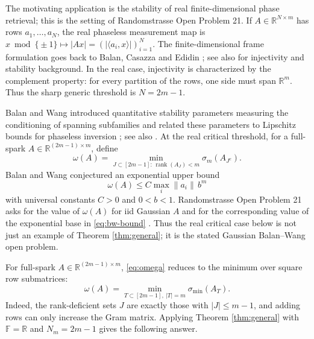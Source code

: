 \documentclass[10pt,a4paper]{amsart}
\DeclareMathOperator{\rank}{rank}
\newcommand{\R}{\mathbb{R}}
\newcommand{\F}{\mathbb{F}}
\begin{document}
The motivating application is the stability of real finite-dimensional phase retrieval; this is the
setting of Randomstrasse Open Problem 21. If $A\in\R^{N\times m}$ has rows $a_1,\ldots,a_N$, the real
phaseless measurement map is $x\bmod\{\pm1\}\mapsto |Ax|=(|\langle a_i,x\rangle|)_{i=1}^N$. The
finite-dimensional frame formulation goes back to Balan, Casazza and Edidin
\cite{BalanCasazzaEdidin2006}; see also \cite{BandeiraCahillMixonNelson2014,
ConcaEdidinHeringVinzant2015,GrohsKoppensteinerRathmair2020} for injectivity and stability background.
In the real case, injectivity is characterized by the complement property: for every partition of the
rows, one side must span $\R^m$. Thus the sharp generic threshold is $N=2m-1$.

Balan and Wang introduced quantitative stability parameters measuring the conditioning of spanning
subfamilies and related these parameters to Lipschitz bounds for phaseless inversion
\cite{BalanWang2015}; see also \cite{Balan2017,BalanZou2016,EldarMendelson2014}. At the real critical
threshold, for a full-spark $A\in\R^{(2m-1)\times m}$, define
\begin{equation}\label{eq:omega}
  \omega(A)=\min_{J\subset[2m-1]:\,\rank(A_J)<m}\sigma_m(A_{J^c}).
\end{equation}
Balan and Wang conjectured an exponential upper bound
\begin{equation}\label{eq:bw-bound}
  \omega(A)\le C\max_i\|a_i\|\, b^m
\end{equation}
with universal constants $C>0$ and $0<b<1$. Randomstrasse Open Problem 21 asks for the value of
$\omega(A)$ for iid Gaussian $A$ and for the corresponding value of the exponential base in
\eqref{eq:bw-bound} \cite{BandeiraRandomstrasse2025,BandeiraRandomstrasse2026}. Thus the real critical
case below is not just an example of Theorem \ref{thm:general}; it is the stated Gaussian Balan--Wang
open problem.

For full-spark $A\in\R^{(2m-1)\times m}$, \eqref{eq:omega} reduces to the minimum over square row
submatrices:
\begin{equation}\label{eq:omega-square}
  \omega(A)=\min_{T\subset[2m-1],\ |T|=m}\sigma_{\min}(A_T).
\end{equation}
Indeed, the rank-deficient sets $J$ are exactly those with $|J|\le m-1$, and adding rows can only
increase the Gram matrix. Applying Theorem \ref{thm:general} with $\F=\R$ and $N_m=2m-1$ gives the
following answer.
\end{document}
